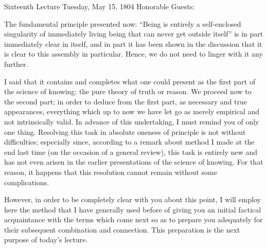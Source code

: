 Sixteenth Lecture
Tuesday, May 15, 1804
Honorable Guests:

The fundamental principle presented now:
“Being is entirely a self-enclosed singularity
of immediately living being
that can never get outside itself”
is in part immediately clear in itself,
and in part it has been shown in the discussion
that it is clear to this assembly in particular.
Hence, we do not need to linger with it any further.

I said that it contains and completes
what one could present as the first part
of the science of knowing:
the pure theory of truth or reason.
We proceed now to the second part;
in order to deduce from the first part,
as necessary and true appearances,
everything which up to now we have
let go as merely empirical
and not intrinsically valid.
In advance of this undertaking,
I must remind you of only one thing.
Resolving this task in absolute oneness
of principle is not without difficulties;
especially since, according to a remark about method
I made at the end last time
(on the occasion of a general review),
this task is entirely new
and has not even arisen in the earlier
presentations of the science of knowing.
For that reason, it happens that this resolution
cannot remain without some complications.

However, in order to be completely clear with you about this point,
I will employ here the method that I have generally used before
of giving you an initial factical acquaintance with the terms
which come next so as to prepare you adequately
for their subsequent combination and connection.
This preparation is the next purpose of today's lecture.

